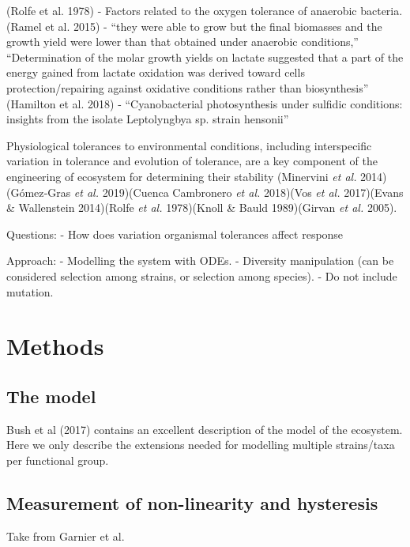 \documentclass{article}
\begin{document}
(Rolfe et al. 1978) - Factors related to the oxygen tolerance of
anaerobic bacteria. (Ramel et al. 2015) - ``they were able to grow but
the final biomasses and the growth yield were lower than that obtained
under anaerobic conditions,'' ``Determination of the molar growth yields
on lactate suggested that a part of the energy gained from lactate
oxidation was derived toward cells protection/repairing against
oxidative conditions rather than biosynthesis'' (Hamilton et al. 2018) -
``Cyanobacterial photosynthesis under sulfidic conditions: insights from
the isolate Leptolyngbya sp. strain hensonii''

Physiological tolerances to environmental conditions, including
interspecific variation in tolerance and evolution of tolerance, are a
key component of the engineering of ecosystem for determining their
stability (Minervini \emph{et al.} 2014)(Gómez‐Gras \emph{et al.}
2019)(Cuenca Cambronero \emph{et al.} 2018)(Vos \emph{et al.}
2017)(Evans \& Wallenstein 2014)(Rolfe \emph{et al.} 1978)(Knoll \&
Bauld 1989)(Girvan \emph{et al.} 2005).

Questions: - How does variation organismal tolerances affect response

Approach: - Modelling the system with ODEs. - Diversity manipulation
(can be considered selection among strains, or selection among species).
- Do not include mutation.

\hypertarget{methods}{%
\section{Methods}\label{methods}}

\hypertarget{the-model}{%
\subsection{The model}\label{the-model}}

Bush et al (2017) contains an excellent description of the model of the
ecosystem. Here we only describe the extensions needed for modelling
multiple strains/taxa per functional group.

\hypertarget{measurement-of-non-linearity-and-hysteresis}{%
\subsection{Measurement of non-linearity and
hysteresis}\label{measurement-of-non-linearity-and-hysteresis}}

Take from Garnier et al.
\end{document}
